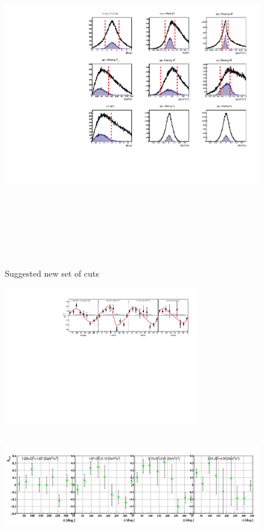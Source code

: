\begin{figure}[h!]
   \includegraphics[height=15.0cm]{incoh/all_incoh_exc_cuts_test.pdf}
\caption{Suggested new set of cuts}
\label{fig:cuts}
\end{figure}

\begin{figure}[h!]
   \includegraphics[height=6.0cm]{incoh/ALU_phi_p_Q2.pdf}
   \includegraphics[height=5.2cm]{incoh/BSA_InCoherent_Q2.png}
\caption{}
\label{fig:cuts}
\end{figure}



